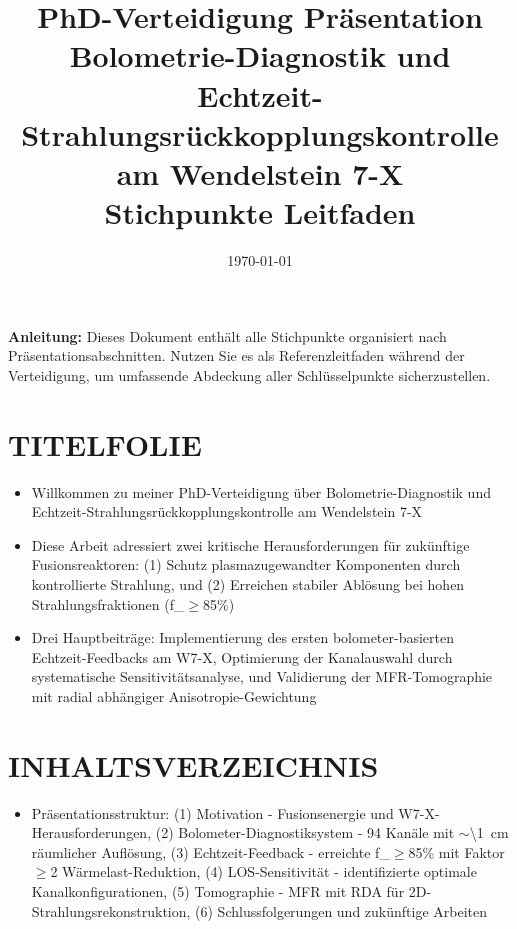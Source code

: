 \documentclass[11pt,a4paper]{article}
\title{\textbf{PhD-Verteidigung Präsentation}\\[0.5em]
\Large Bolometrie-Diagnostik und Echtzeit-Strahlungsrückkopplungskontrolle\\
am Wendelstein 7-X\\[1em]
\large Stichpunkte Leitfaden}
\author{}
\date{\today}
\begin{document}
\maketitle
\thispagestyle{empty}

\vspace{1em}
\noindent\textbf{Anleitung:} Dieses Dokument enthält alle Stichpunkte organisiert nach Präsentationsabschnitten. Nutzen Sie es als Referenzleitfaden während der Verteidigung, um umfassende Abdeckung aller Schlüsselpunkte sicherzustellen.

\newpage
\setcounter{page}{1}

\section{TITELFOLIE}

\begin{itemize}
\item Willkommen zu meiner PhD-Verteidigung über Bolometrie-Diagnostik und Echtzeit-Strahlungsrückkopplungskontrolle am Wendelstein 7-X
\item Diese Arbeit adressiert zwei kritische Herausforderungen für zukünftige Fusionsreaktoren: (1) Schutz plasmazugewandter Komponenten durch kontrollierte Strahlung, und (2) Erreichen stabiler Ablösung bei hohen Strahlungsfraktionen (f_{}$\geq$85\%)
\item Drei Hauptbeiträge: Implementierung des ersten bolometer-basierten Echtzeit-Feedbacks am W7-X, Optimierung der Kanalauswahl durch systematische Sensitivitätsanalyse, und Validierung der MFR-Tomographie mit radial abhängiger Anisotropie-Gewichtung
\end{itemize}

\section{INHALTSVERZEICHNIS}

\begin{itemize}
\item Präsentationsstruktur: (1) Motivation - Fusionsenergie und W7-X-Herausforderungen, (2) Bolometer-Diagnostiksystem - 94 Kanäle mit $\sim$\SI{\1}{cm} räumlicher Auflösung, (3) Echtzeit-Feedback - erreichte f_{}$\geq$85\% mit Faktor $\geq$2 Wärmelast-Reduktion, (4) LOS-Sensitivität - identifizierte optimale Kanalkonfigurationen, (5) Tomographie - MFR mit RDA für 2D-Strahlungsrekonstruktion, (6) Schlussfolgerungen und zukünftige Arbeiten
\end{itemize}
\end{document}
